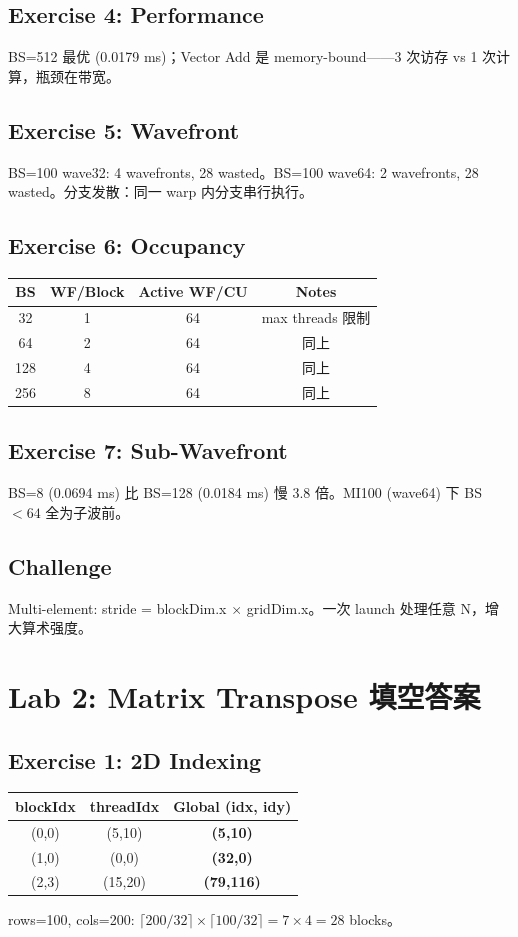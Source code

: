 \documentclass[a4paper]{article}
\begin{document}
\subsection*{Exercise 4: Performance}
BS=512 最优 (0.0179 ms)；Vector Add 是 memory-bound——3 次访存 vs 1 次计算，瓶颈在带宽。

\subsection*{Exercise 5: Wavefront}
BS=100 wave32: 4 wavefronts, 28 wasted。BS=100 wave64: 2 wavefronts, 28 wasted。分支发散：同一 warp 内分支串行执行。

\subsection*{Exercise 6: Occupancy}
\begin{tabular}{|c|c|c|c|}
\hline
BS & WF/Block & Active WF/CU & Notes \\
\hline
32 & 1 & 64 & max threads 限制 \\
64 & 2 & 64 & 同上 \\
128 & 4 & 64 & 同上 \\
256 & 8 & 64 & 同上 \\
\hline
\end{tabular}

\subsection*{Exercise 7: Sub-Wavefront}
BS=8 (0.0694 ms) 比 BS=128 (0.0184 ms) 慢 3.8 倍。MI100 (wave64) 下 BS $<64$ 全为子波前。

\subsection*{Challenge}
Multi-element: stride = blockDim.x $\times$ gridDim.x。一次 launch 处理任意 N，增大算术强度。

\newpage
\section{Lab 2: Matrix Transpose 填空答案}

\subsection*{Exercise 1: 2D Indexing}
\begin{tabular}{|c|c|c|}
\hline
blockIdx & threadIdx & Global (idx, idy) \\
\hline
(0,0) & (5,10) & \textbf{(5,10)} \\
(1,0) & (0,0) & \textbf{(32,0)} \\
(2,3) & (15,20) & \textbf{(79,116)} \\
\hline
\end{tabular}
rows=100, cols=200: $\lceil200/32\rceil \times \lceil100/32\rceil = 7 \times 4 = 28$ blocks。
\end{document}
